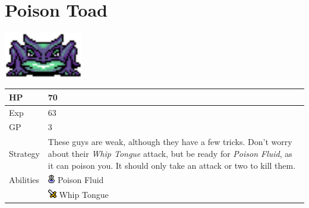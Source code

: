 \section{Poison Toad}
\label{monster:poison_toad}

\includegraphics[height=2cm,keepaspectratio]{./resources/monster/poison_toad}

\begin{longtable}{ l p{9cm} }
	HP
	& 70
\\ \hline
	Exp
	& 63
\\ \hline
	GP
	& 3
\\ \hline
	Strategy
	& These guys are weak, although they have a few tricks. Don't worry about their \textit{Whip Tongue} attack, but be ready for \textit{Poison Fluid}, as it can poison you. It should only take an attack or two to kill them.
\\ \hline
	Abilities
	& \includegraphics[height=1em,keepaspectratio]{./resources/effects/poison} Poison Fluid \\
	& \includegraphics[height=1em,keepaspectratio]{./resources/effects/damage} Whip Tongue
\end{longtable}
